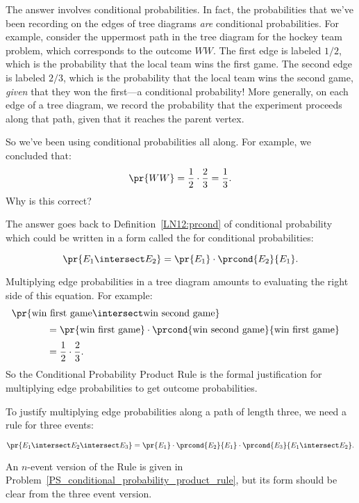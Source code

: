 The answer involves conditional probabilities.  In fact, the
probabilities that we've been recording on the edges of tree diagrams
\emph{are} conditional probabilities.  For example, consider the
uppermost path in the tree diagram for the hockey team problem, which
corresponds to the outcome $WW$.  The first edge is labeled $1/2$,
which is the probability that the local team wins the first game.  The
second edge is labeled $2 / 3$, which is the probability that the
local team wins the second game, \emph{given} that they won the
first---a conditional probability!  More generally, on each
edge of a tree diagram, we record the probability that the experiment
proceeds along that path, given that it reaches the parent vertex.

So we've been using conditional probabilities all along.  \iffalse But why can
we multiply edge probabilities to get outcome probabilities?\fi  For
example, we concluded that:
%
\begin{equation*}
\pr{WW} = \frac{1}{2} \cdot \frac{2}{3}
	= \frac{1}{3}.
\end{equation*}
%
Why is this correct?

The answer goes back to Definition~\ref{LN12:prcond} of conditional probability
which could be written in a form called the  for
conditional probabilities:
%
\begin{rul*}
%
\[
    \pr{E_1 \intersect E_2} = \pr{E_1} \cdot \prcond{E_2}{E_1}.
\]
\end{rul*}
Multiplying edge probabilities in a tree diagram amounts to evaluating
the right side of this equation.  For example:
\begin{align*}
\lefteqn{\pr{\text{win first game} \intersect \text{win second game}}}
		\hspace{0.5in} \\[2pt]
	& = \pr{\text{win first game}} \cdot
            \prcond{\text{win second game}}{\text{win first game}} \\[2pt]
	& = \frac{1}{2} \cdot \frac{2}{3}.
\end{align*}
So the Conditional Probability Product Rule is the formal
justification for multiplying edge probabilities to get outcome
probabilities.

To justify multiplying edge probabilities along a path of length three, we need
a rule for three events:
\begin{rul*}
%
\[
    \pr{E_1 \intersect E_2 \intersect E_3} = \pr{E_1} \cdot
    \prcond{E_2}{E_1} \cdot
\prcond{E_3}{E_1 \intersect E_2}.
\]
\end{rul*}
An $n$-event version of the Rule is given in
Problem~\ref{PS_conditional_probability_product_rule}, but its form
should be clear from the three event version.

